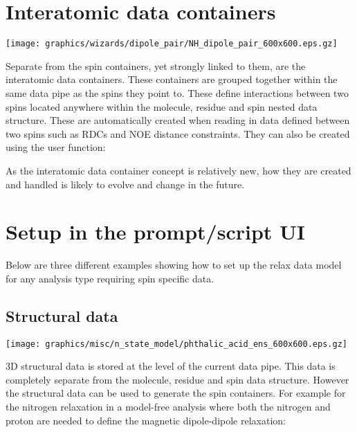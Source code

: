 \section{Interatomic data containers} \label{sect: interatomic container}

\begin{figure*}[h]
\texttt{[image: graphics/wizards/dipole\_pair/NH\_dipole\_pair\_600x600.eps.gz]}
\end{figure*}

Separate from the spin containers, yet strongly linked to them, are the interatomic data containers.  These containers are grouped together within the same data pipe as the spins they point to.  These define interactions between two spins located anywhere within the molecule, residue and spin nested data structure.  These are automatically created when reading in data defined between two spins such as RDCs and NOE distance constraints.  They can also be created using the  user function:


As the interatomic data container concept is relatively new, how they are created and handled is likely to evolve and change in the future.




\section{Setup in the prompt/script UI}

Below are three different examples showing how to set up the relax data model for any analysis type requiring spin specific data.



\subsection{Structural data} \label{sect: script - structural data}

\begin{figure*}[h]
\texttt{[image: graphics/misc/n\_state\_model/phthalic\_acid\_ens\_600x600.eps.gz]}
\end{figure*}

3D structural data is stored at the level of the current data pipe.  This data is completely separate from the molecule, residue and spin data structure.  However the structural data can be used to generate the spin containers.  For example for the nitrogen relaxation in a model-free analysis where both the nitrogen and proton are needed to define the magnetic dipole-dipole relaxation:

